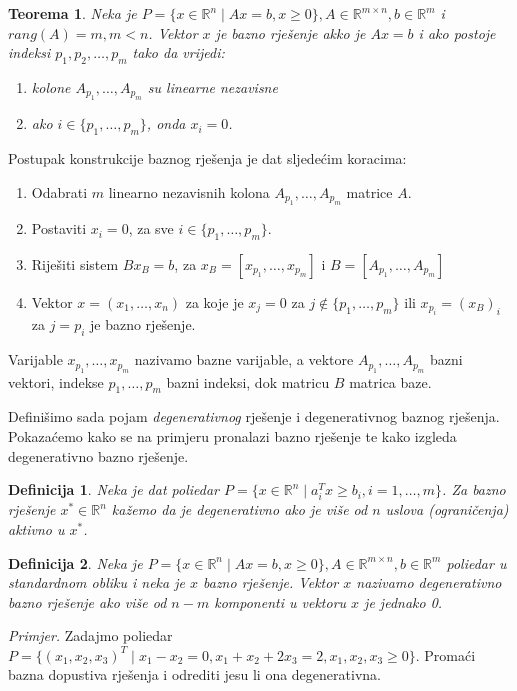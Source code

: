\documentclass[a4paper, utf8, 11pt, colorlinks]{article}
\newtheorem{definition}{Definicija}
\newtheorem{thm}{Teorema}
\begin{document}
\begin{thm}
   Neka je $P = \{ x \in \mathbb{R}^n \mid A x = b, x \geq 0\}, A \in \mathbb{R}^{m \times n}, b \in \mathbb{R}^m$ i $rang(A)= m, m < n$.
   Vektor $x$ je bazno rješenje  akko je $A x = b$ i ako postoje indeksi $p_1,p_2,\ldots, p_m$ tako da vrijedi:
   \begin{enumerate}
       \item kolone $A_{p_1},\ldots, A_{p_m}$ su linearne nezavisne
       \item ako $i \in \{p_1,\ldots, p_m\}$, onda $x_i = 0$.
   \end{enumerate}
   
\end{thm}
Postupak konstrukcije baznog rješenja je dat sljedećim koracima:
\begin{enumerate}
    \item Odabrati $m$ linearno nezavisnih kolona $A_{p_1}, \ldots, A_{p_m}$ matrice $A$.
    \item Postaviti $x_i = 0$, za sve $i \in \{p_1,\ldots, p_m \}$.
    \item Riješiti sistem $B x_B = b$, za $x_B = [x_{p_1}, \ldots, x_{p_m}]$ i $B= [A_{p_1}, \ldots, A_{p_m}]$
    \item Vektor $x = (x_1,\ldots, x_n)$ za koje je $x_j = 0$ za $j  \not \in \{p_1,\ldots, p_m \}$ ili $x_{p_i} = (x_B)_i$ za $j = p_i$ je bazno rješenje. 
\end{enumerate}
Varijable $x_{p_1},\ldots, x_{p_m}$ nazivamo bazne varijable, a vektore  $A_{p_1}, \ldots, A_{p_m}$ bazni vektori, indekse $p_1,\ldots, p_m$ bazni indeksi, dok matricu $B$ matrica baze. 


Definišimo sada pojam \emph{degenerativnog} rješenje i degenerativnog baznog rješenja. Pokazaćemo kako se na primjeru pronalazi bazno rješenje te kako izgleda degenerativno bazno rješenje.

\begin{definition}
      Neka je dat poliedar $P = \{ x \in \mathbb{R}^n \mid a_i^T x \geq b_i, i=1,\ldots,m \}$. Za bazno rješenje $x^*\in \mathbb{R}^n$ kažemo da je degenerativno ako je više od $n$ uslova (ograničenja) aktivno u $x^*$. 
      
\end{definition}

\begin{definition}
      Neka je $P = \{ x \in \mathbb{R}^n \mid A x = b, x \geq 0\}, A \in \mathbb{R}^{m \times n}, b \in \mathbb{R}^m$ poliedar u standardnom obliku i neka je $x$ bazno rješenje. Vektor $x$ nazivamo degenerativno bazno rješenje ako više od $n-m$ komponenti u vektoru $x$ je jednako 0.
\end{definition}
\emph{Primjer.} Zadajmo poliedar $P= \{ (x_1,x_2,x_3)^T \mid x_1 - x_2 = 0, x_1 + x_2 + 2 x_3 = 2, x_1,x_2,x_3 \geq 0 \}$.  Promaći bazna dopustiva rješenja i odrediti jesu li ona degenerativna. \\
\end{document}
